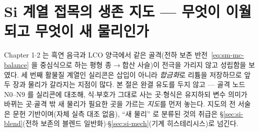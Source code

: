 \section{Si 계열 접목의 생존 지도 --- 무엇이 이월되고 무엇이 새 물리인가}\label{sec:si-survival}
Chapter 1$\cdot$2 는 흑연 음극과 LCO 양극에서 같은 골격(전하 보존 반전~\eqref{eq:sm-mc-balance} 을 중심식으로
하는 평형 종$\to$합산 사슬)이 전극을 가리지 않고 성립함을 보였다. 세 번째 활물질 계열인 실리콘은 삽입이
아니라 \emph{합금화}로 리튬을 저장하므로 앞 두 장과 물리가 갈라지는 지점이 많다. 본 절은 완결 유도를
두지 않고 --- 골격 노드 $\mathrm{N0}$--$\mathrm{N9}$ 를 실리콘에 대조해, 식$\cdot$부호가 그대로 사는
곳$\cdot$형식은 유지하되 변수 의미가 바뀌는 곳$\cdot$골격 밖 새 물리가 필요한 곳을 가르는 \emph{지도}를 먼저
놓는다. 지도의 전 서술은 문헌 기반이며(자체 실측 대조 없음), ``새 물리'' 로 분류된 것의 취급은
\S\ref{sec:si-blend}(전하 보존의 블렌드 일반화)$\cdot$\S\ref{sec:si-mech}(기계 히스테리시스)로 넘긴다.

